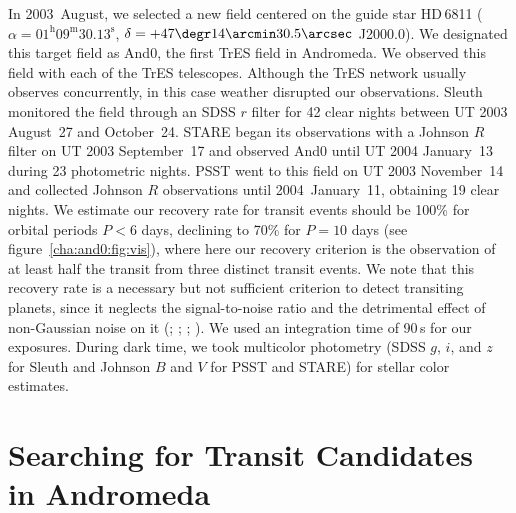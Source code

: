 In 2003~August, we selected a new field centered on the guide star \mbox{HD\,6811} ($\alpha = 01^{\mathrm h} 09^{\mathrm m} 30.13^{\mathrm s}$, $\delta = +47\degr 14\arcmin 30.5\arcsec$ J2000.0).
We designated this target field as And0, the first TrES field in Andromeda.
We observed this field with each of the TrES telescopes.
Although the TrES network usually observes concurrently, in this case weather disrupted our observations.
Sleuth monitored the field through an SDSS $r$ filter for 42 clear nights between UT 2003 August~27 and October~24.
STARE began its observations with a Johnson $R$ filter on UT 2003 September~17 and observed And0 until UT 2004 January~13 during 23 photometric nights.
PSST went to this field on UT 2003 November~14 and collected Johnson $R$ observations until 2004~January~11, obtaining 19 clear nights.
We estimate our recovery rate for transit events should be 100\% for orbital periods $P<6$ days, declining to 70\% for $P=10$ days (see figure~\ref{cha:and0:fig:vis}), where here our recovery criterion is the observation of at least half the transit from three distinct transit events.
We note that this recovery rate is a necessary but not sufficient criterion to detect transiting planets, since it neglects the signal-to-noise ratio and the detrimental effect of non-Gaussian noise on it (\citealp*[see, e.g.,][]{Gaudi_Seager_Mallen-Ornelas:apj:2005a}; \citealp{Gaudi:apjl:2005a}; \citealp*{Pont_Zucker_Queloz:mnras:2006a}; \citealp{Smith_Collier-Cameron_Christian:mnras:2006a, Gaudi_Winn:apj:2007a}).
We used an integration time of 90\,s for our exposures.
During dark time, we took multicolor photometry (SDSS $g$, $i$, and $z$ for Sleuth and Johnson $B$ and $V$ for PSST and STARE) for stellar color estimates.

\section[Searching for Transit Candidates in Andromeda]{Searching for Transit Candidates \\ in Andromeda}\label{cha:and0:sec:search}

